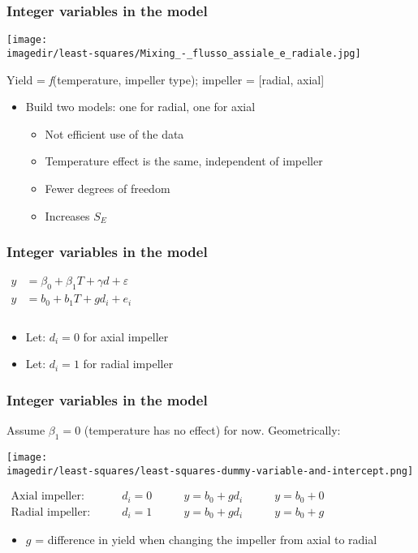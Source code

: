 \begin{frame}\frametitle{Integer variables in the model}
	\begin{center}
		\texttt{[image: \\imagedir/least-squares/Mixing\_-\_flusso\_assiale\_e\_radiale.jpg]}
	\end{center}
	
	Yield = \emph{f}(temperature, impeller type); impeller = [radial, axial] 
	\begin{itemize}
		\item	Build two models: one for radial, one for axial 
		\begin{itemize}
			\item	Not efficient use of the data 
			\item	Temperature effect is the same, independent of impeller 
			\item	Fewer degrees of freedom 
			\item	Increases $S_E$ 
		\end{itemize}
	\end{itemize}
\end{frame}

\begin{frame}\frametitle{Integer variables in the model}
	
	$ 
	\begin{array}{lr}
		y &= \beta_0 + \beta_1 T + \gamma d + \varepsilon \\
		y &= b_0 + b_1 T + g d_i + e_i \\
		\\
	\end{array}
	$ 
	\begin{itemize}
		\item	Let: $d_i = 0$ for axial impeller 
		\item	Let: $d_i = 1$ for radial impeller 
	\end{itemize}
\end{frame}

\begin{frame}\frametitle{Integer variables in the model}
	
	Assume $\beta_1 = 0$ (temperature has no effect) for now. Geometrically:
	\begin{center}
		\texttt{[image: \\imagedir/least-squares/least-squares-dummy-variable-and-intercept.png]}
	\end{center}
	$ 
	\begin{array}{llll}
		\text{Axial impeller:} \qquad & d_i=0 &\qquad y = b_0 + gd_i &\qquad y = b_0 + 0 \\
		\text{Radial impeller:} \qquad & d_i=1 &\qquad y = b_0 + gd_i & \qquad y = b_0 + g 
	\end{array}
	$ 
	\begin{itemize}
		\item	$g$ = difference in yield when changing the impeller from axial to radial 
	\end{itemize}
\end{frame}

